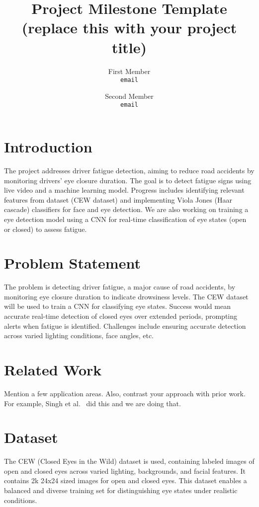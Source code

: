 \documentclass[10pt,twocolumn,letterpaper]{article}
\begin{document}
\title{Project Milestone Template (replace this with your project title)}

\author{First Member\\
{\tt\small email}
\and
Second Member\\
{\tt\small email}
}
\maketitle


\section{Introduction}

The project addresses driver fatigue detection, aiming to reduce road accidents by monitoring drivers’ eye closure duration. The goal is to detect fatigue signs using live video and a machine learning model. Progress includes identifying relevant features from dataset (CEW dataset) and implementing Viola Jones (Haar cascade) classifiers for face and eye detection. We are also working on training a eye detection model using a CNN for real-time classification of eye states (open or closed) to assess fatigue.

\section{Problem Statement}

The problem is detecting driver fatigue, a major cause of road accidents, by monitoring eye closure duration to indicate drowsiness levels. The CEW dataset will be used to train a CNN for classifying eye states. Success would mean accurate real-time detection of closed eyes over extended periods, prompting alerts when fatigue is identified. Challenges include ensuring accurate detection across varied lighting conditions, face angles, etc.

\section{Related Work}
Mention a few application areas. Also, contrast your approach with prior work. For example, Singh et al.~\cite{DBLP:conf/cvpr/SinghJL23} did this and we are doing that.

\section{Dataset}
The CEW (Closed Eyes in the Wild) dataset is used, containing labeled images of open and closed eyes across varied lighting, backgrounds, and facial features. It contains 2k 24x24 sized images for open and closed eyes. This dataset enables a balanced and diverse training set for distinguishing eye states under realistic conditions.
\end{document}
